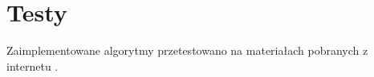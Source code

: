 \chapter{Testy}

Zaimplementowane algorytmy przetestowano na materiałach pobranych z internetu \cite{Geiger2013IJRR}.
